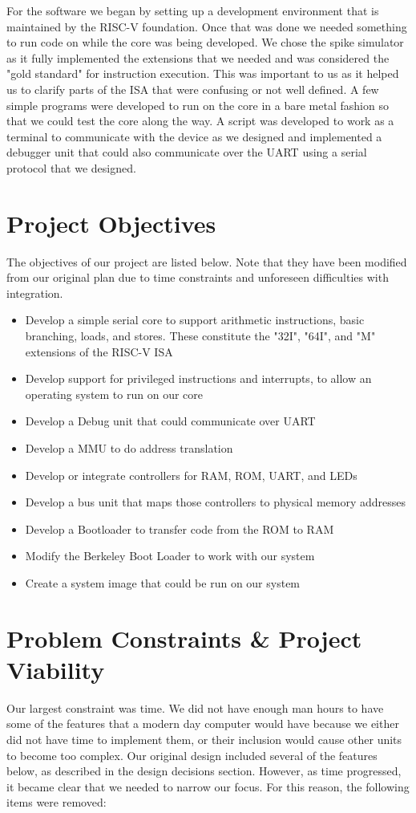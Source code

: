 \documentclass{article}
\begin{document}
For the software we began by setting up a development environment that is maintained by the RISC-V foundation. Once that was done we needed something to run code on while the core was being developed. We chose the spike simulator as it fully implemented the extensions that we needed and was considered the "gold standard" for instruction execution. This was important to us as it helped us to clarify parts of the ISA that were confusing or not well defined. A few simple programs were developed to run on the core in a bare metal fashion so that we could test the core along the way. A script was developed to work as a terminal to communicate with the device as we designed and implemented a debugger unit that could also communicate over the UART using a serial protocol that we designed.

\section{Project Objectives}
The objectives of our project are listed below.  Note that they have been modified from our original plan due to time constraints and unforeseen difficulties with integration.
\begin{itemize}
    \item Develop a simple serial core to support arithmetic instructions, basic branching, loads, and stores.  These constitute the "32I", "64I", and "M" extensions of the RISC-V ISA
    \item Develop support for privileged instructions and interrupts, to allow an operating system to run on our core
    \item Develop a Debug unit that could communicate over UART
    \item Develop a MMU to do address translation
    \item Develop or integrate controllers for RAM, ROM, UART, and LEDs
    \item Develop a bus unit that maps those controllers to physical memory addresses
    \item Develop a Bootloader to transfer code from the ROM to RAM
    \item Modify the Berkeley Boot Loader to work with our system
    \item Create a system image that could be run on our system
\end{itemize}

\section{Problem Constraints \& Project Viability}
Our largest constraint was time. We did not have enough man hours to have some of the features that a modern day computer would have because we either did not have time to implement them, or their inclusion would cause other units to become too complex. Our original design included several of the features below, as described in the design decisions section.  However, as time progressed, it became clear that we needed to narrow our focus.  For this reason, the following items were removed:
\end{document}

